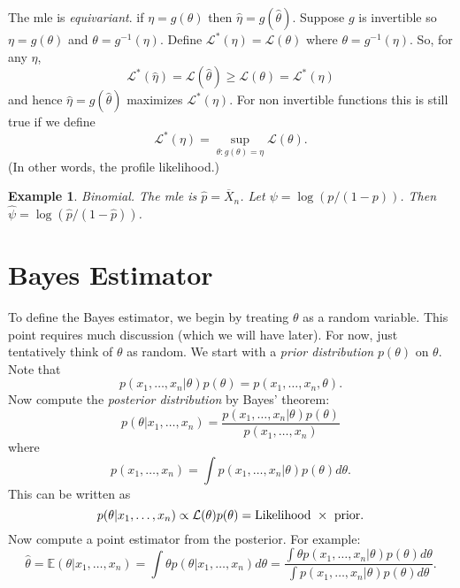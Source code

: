 \documentclass[twoside,12pt]{article}
\newtheorem{example}[theorem]{Example}
\begin{document}
\vspace{1cm}



The mle is {\em equivariant}.
if $\eta = g(\theta)$ then
$\widehat\eta = g(\widehat\theta)$.
Suppose $g$ is invertible so
$\eta = g(\theta)$ and
$\theta = g^{-1}(\eta)$.
Define
$ \mathcal{L}^*(\eta) =  \mathcal{L}(\theta)$ where
$\theta = g^{-1}(\eta)$.
So, for any $\eta$,
$$
 \mathcal{L}^*(\widehat\eta) =  \mathcal{L}(\widehat\theta) \geq  \mathcal{L}(\theta) =  \mathcal{L}^*(\eta)
$$
and hence
$\widehat\eta = g(\widehat\theta)$ maximizes $ \mathcal{L}^*(\eta)$.
For non invertible functions this is still true if we define
$$
 \mathcal{L}^*(\eta) = \sup_{\theta: g(\theta)=\eta}  \mathcal{L}(\theta).
$$
(In other words, the profile likelihood.)

\begin{example}
Binomial.
The mle is $\widehat p = \overline{X}_n$.
Let $\psi = \log (p/(1-p))$.
Then
$\widehat\psi = \log (\widehat p/(1-\widehat p))$.
\end{example}



\section{Bayes Estimator}

To define the Bayes estimator,
we begin by treating $\theta$ as a random variable.
This point requires much discussion (which we will have later).
For now, just tentatively think of $\theta$ as random.
We start with a {\em prior distribution} $p(\theta)$ on $\theta$.
Note that
$$
p(x_1,\ldots, x_n |\theta)p(\theta)=p(x_1,\ldots, x_n,\theta).
$$
Now
compute the {\em posterior distribution} by Bayes' theorem:
$$
p(\theta|x_1,\ldots, x_n) = \frac{p(x_1,\ldots, x_n|\theta)p(\theta)}{p(x_1,\ldots, x_n)}
$$
where
$$
p(x_1,\ldots, x_n) = \int p(x_1,\ldots, x_n|\theta)p(\theta) d\theta.
$$
This can be written as
$$
p(\theta|x_1,\ldots, x_n) \propto  \mathcal{L}(\theta)p(\theta) = 
{\rm Likelihood}\ \times \ {\rm prior}.
$$
Now compute a point estimator from the posterior.
For example:
$$
\widehat\theta = \mathbb{E}(\theta|x_1,\ldots,x_n) = 
\int \theta p(\theta|x_1,\ldots, x_n) d\theta =
\frac{\int \theta p(x_1,\ldots, x_n|\theta)p(\theta) d\theta}
{\int p(x_1,\ldots, x_n|\theta)p(\theta) d\theta}.
$$
\end{document}
